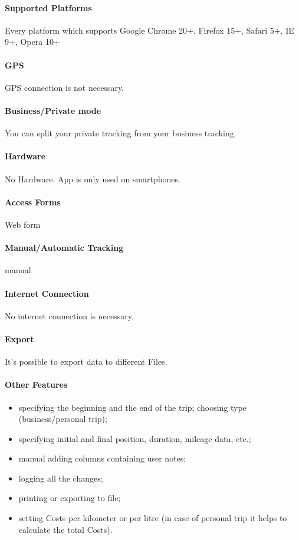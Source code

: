 \paragraph{Supported Platforms} Every platform which supports  Google Chrome 20+, Firefox 15+, Safari 5+, IE 9+, Opera 10+
\paragraph{GPS} GPS connection is not necessary.
\paragraph{Business/Private mode} You can split your private tracking from your business tracking.
\paragraph{Hardware}No Hardware. App is only used on smartphones.
\paragraph{Access Forms}Web form
\paragraph{Manual/Automatic Tracking}manual
\paragraph{Internet Connection}No internet connection is necessary.
\paragraph{Export}It’s possible to export data to different Files.
\paragraph{Other Features}
\begin{itemize}
\item specifying the beginning and the end of the trip;
choosing type (business/personal trip);
\item specifying initial and final position, duration, mileage data, etc.;
\item manual adding columns containing user notes;
\item logging all the changes;
\item printing or exporting to file;
\item setting Costs per kilometer or per litre (in case of personal trip it helps to calculate the total Costs).
\end{itemize}
\newpage

